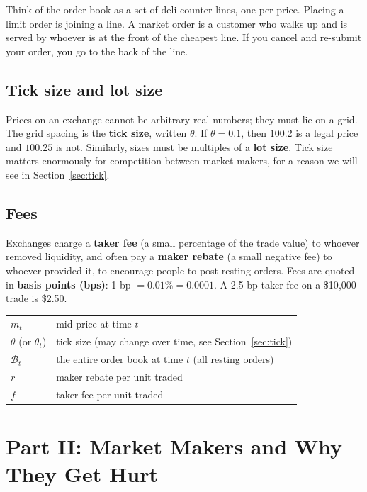 \documentclass[11pt]{article}
\begin{document}
\begin{intuition}
Think of the order book as a set of deli-counter lines, one per price. Placing a limit order is joining a line. A market order is a customer who walks up and is served by whoever is at the front of the cheapest line. If you cancel and re-submit your order, you go to the back of the line.
\end{intuition}

\subsection{Tick size and lot size}
Prices on an exchange cannot be arbitrary real numbers; they must lie on a grid. The grid spacing is the \textbf{tick size}, written $\theta$. If $\theta=0.1$, then $100.2$ is a legal price and $100.25$ is not. Similarly, sizes must be multiples of a \textbf{lot size}. Tick size matters enormously for competition between market makers, for a reason we will see in Section~\ref{sec:tick}.

\subsection{Fees}
Exchanges charge a \textbf{taker fee} (a small percentage of the trade value) to whoever removed liquidity, and often pay a \textbf{maker rebate} (a small negative fee) to whoever provided it, to encourage people to post resting orders. Fees are quoted in \textbf{basis points (bps)}: 1 bp $=0.01\%=0.0001$. A 2.5 bp taker fee on a \$10{,}000 trade is \$2.50.

\begin{notation}
\begin{tabular}{ll}
$m_t$ & mid-price at time $t$\\
$\theta$ (or $\theta_t$) & tick size (may change over time, see Section~\ref{sec:tick})\\
$\mathcal{B}_t$ & the entire order book at time $t$ (all resting orders)\\
$r$ & maker rebate per unit traded\\
$f$ & taker fee per unit traded\\
\end{tabular}
\end{notation}

\section{Part II: Market Makers and Why They Get Hurt}
\end{document}
